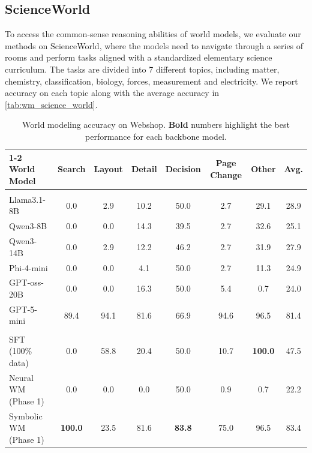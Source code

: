 \documentclass{article}
\theoremstyle{plain}
\theoremstyle{definition}
\theoremstyle{remark}
\begin{document}
\subsection{ScienceWorld}\label{sec:scienceworld}
To access the common-sense reasoning abilities of world models, we evaluate our methods on ScienceWorld, where the models need to navigate through a series of rooms and perform tasks aligned with a standardized elementary science curriculum. The tasks are divided into 7 different topics, including matter, chemistry, classification, biology, forces, measurement and electricity. We report accuracy on each topic along with the average accuracy in \cref{tab:wm_science_world}.
\begin{table}[ht]
  \caption{
  World modeling accuracy on Webshop. \textbf{Bold} numbers highlight the best performance for each backbone model.
  }
  \label{tab:wm_webshop}
  \centering
  \begin{tabular}{lccccccc}
    \toprule
    \cmidrule(r){1-2}
    World Model & Search & Layout & Detail & Decision & Page Change & Other & Avg.\\
    \midrule
    \rowcolor{gray!15}
    \multicolumn{8}{c}{\bf Baseline Models} \\
    \midrule
    Llama3.1-8B & 0.0 & 2.9 & 10.2 & 50.0 & 2.7 & 29.1 & 28.9\\
    Qwen3-8B & 0.0 & 0.0 & 14.3 & 39.5 & 2.7 & 32.6 & 25.1\\
    Qwen3-14B & 0.0 & 2.9 & 12.2 & 46.2 & 2.7 & 31.9 & 27.9\\
    Phi-4-mini & 0.0 & 0.0 & 4.1 & 50.0 & 2.7 & 11.3 & 24.9\\
    GPT-oss-20B & 0.0 & 0.0 & 16.3 & 50.0 & 5.4 & 0.7 & 24.0\\
    GPT-5-mini & 89.4 & 94.1 & 81.6 & 66.9 & 94.6 & 96.5 & 81.4\\
    \midrule
    \rowcolor{gray!15}
    \multicolumn{8}{c}{\bf Llama3.2-1B} \\
    \midrule
    SFT (100\% data) & 0.0 & 58.8 & 20.4 & 50.0 & 10.7 & \textbf{100.0} & 47.5\\
    \midrule
    Neural WM (Phase 1) & 0.0 & 0.0 & 0.0 & 50.0 & 0.9 & 0.7 & 22.2\\
    Symbolic WM (Phase 1) & \textbf{100.0} & 23.5 & 81.6 & \textbf{83.8} & 75.0 & 96.5 & 83.4\\

\end{tabular}
\end{table}
\end{document}

